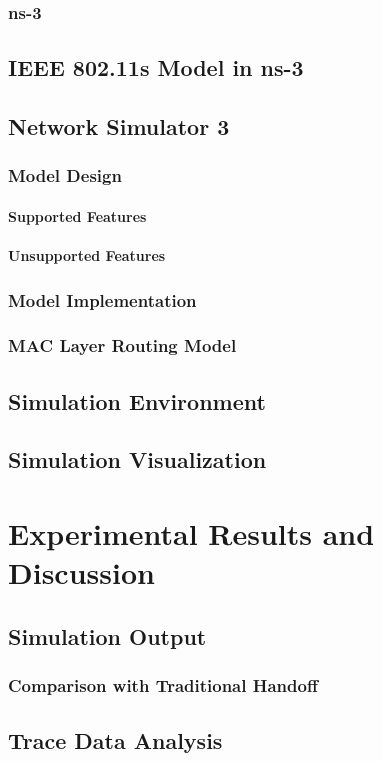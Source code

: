 \documentclass[12pt,a4paper]{report}
\begin{document}
\subsection{ns-3}
\section{IEEE 802.11s Model in ns-3}
\section{Network Simulator 3}
\subsection{Model Design}
\subsubsection{Supported Features}
\subsubsection{Unsupported Features}
\subsection{Model Implementation}
\subsection{MAC Layer Routing Model}
\section{Simulation Environment}
\section{Simulation Visualization}

\chapter{Experimental Results and Discussion}
\section{Simulation Output }
\subsection{Comparison with Traditional Handoff}
\section{Trace Data Analysis}
\end{document}
